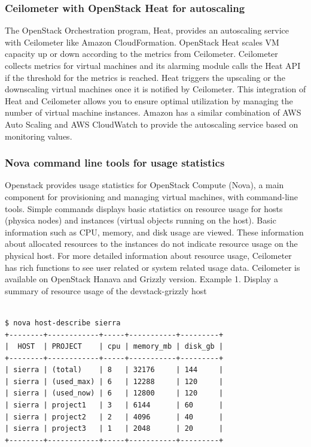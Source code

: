 \documentclass{sig-alternate}
\begin{document}
\subsubsection{Ceilometer with OpenStack Heat for autoscaling}

The OpenStack Orchestration program, Heat, provides an autoscaling service with Ceilometer like Amazon CloudFormation. OpenStack Heat scales VM capacity up or down according to the metrics from Ceilometer. Ceilometer collects metrics for virtual machines and its alarming module calls the Heat API if the threshold for the metrics is reached. Heat triggers the upscaling or the downscaling virtual machines once it is notified by Ceilometer. This integration of Heat and Ceilometer allows you to ensure optimal utilization by managing the number of virtual machine instances. Amazon has a similar combination of AWS Auto Scaling and AWS CloudWatch to provide the autoscaling service based on monitoring values. ~\cite{Abaakouk13}

\subsubsection{Nova command line tools for usage statistics}

Openstack provides usage statistics for OpenStack Compute (Nova), a main component for provisioning and managing virtual machines, with command-line tools. Simple commands displays basic statistics on resource usage for hosts (physica nodes) and instances (virtual objects running on the host). Basic information such as CPU, memory, and disk usage are viewed. These information about allocated resources to the instances do not indicate resource usage on the physical host. For more detailed information about resource usage, Ceilometer has rich functions to see user related or system related usage data. Ceilometer is available on OpenStack Hanava and Grizzly version. \newline
Example 1. Display a summary of resource usage of the devstack-grizzly host

\begin{lstlisting}

$ nova host-describe sierra
+--------+------------+-----+-----------+---------+
|  HOST  | PROJECT    | cpu | memory_mb | disk_gb |
+--------+------------+-----+-----------+---------+
| sierra | (total)    | 8   | 32176     | 144     |
| sierra | (used_max) | 6   | 12288     | 120     |
| sierra | (used_now) | 6   | 12800     | 120     |
| sierra | project1   | 3   | 6144      | 60      |
| sierra | project2   | 2   | 4096      | 40      |
| sierra | project3   | 1   | 2048      | 20      |
+--------+------------+-----+-----------+---------+

\end{lstlisting}
\end{document}
